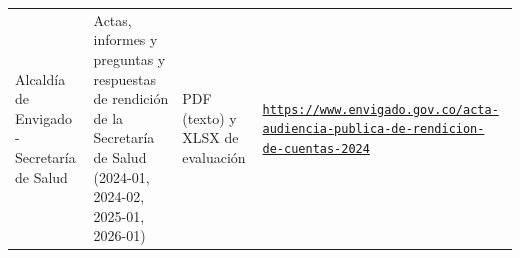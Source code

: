 \documentclass[11pt,letterpaper]{article}
\begin{document}
{\begin{xltabular}{\linewidth}{L{2.8cm}YL{1.6cm}Y}
Alcaldía de Envigado - Secretaría de Salud & Actas, informes y preguntas y respuestas de rendición de la Secretaría de Salud (2024-01, 2024-02, 2025-01, 2026-01) & PDF (texto) y XLSX de evaluación & \texttt{\footnotesize \href{https://www.envigado.gov.co/acta-audiencia-publica-de-rendicion-de-cuentas-2024}{https:/\allowbreak{}}\allowbreak{}\href{https://www.envigado.gov.co/acta-audiencia-publica-de-rendicion-de-cuentas-2024}{/\allowbreak{}}\allowbreak{}\href{https://www.envigado.gov.co/acta-audiencia-publica-de-rendicion-de-cuentas-2024}{www.\allowbreak{}envigado.\allowbreak{}gov.\allowbreak{}co/\allowbreak{}}\allowbreak{}\href{https://www.envigado.gov.co/acta-audiencia-publica-de-rendicion-de-cuentas-2024}{acta-\allowbreak{}audiencia-\allowbreak{}publica-\allowbreak{}de-\allowbreak{}rendicion-\allowbreak{}de-\allowbreak{}cuentas-\allowbreak{}2024}} \\

\end{xltabular}}
\end{document}
